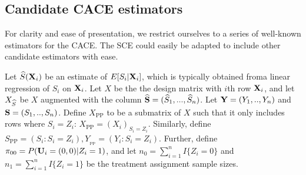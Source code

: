 \documentclass{article}
\def\spp{_{\text{PP}}}
\def\xpp{X\spp}
\newtheorem{assumption}{Assumption}
\begin{document}






\subsection{Candidate CACE estimators}
For clarity and ease of presentation, we restrict ourselves to a series of well-known estimators for the CACE. The SCE could easily be adapted to include other candidate estimators with ease. 

Let ${\widehat S}({\bf X}_i)$ be an estimate of $E[S_i | {\bf X}_i]$, which is typically obtained froma linear regression of $S_i$ on ${\bf X}_i$. Let $X$ be the the design matrix with $i$th row ${\bf X}_i$, and let $X_{\widehat S}$ be $X$ augmented with the column ${\widehat {{\bf S}}} = ({\widehat S}_1, ..., {\widehat S}_n)$. Let ${\bf Y} = (Y_1, .., Y_n)$ and ${\bf S} = (S_1, .., S_n)$. Define $\xpp$ to be a submatrix of $X$ such that it only includes rows where $S_i = Z_i$: $\xpp = (X_i)_{S_i = Z_i}$. Similarly, define $S\spp = (S_i : S_i = Z_i), Y_\spp = (Y_i : S_i = Z_i)$. Further, define $\pi_{00} = P({\bf U}_i = (0,0) | Z_i = 1)$, and let $n_0 = \sum_{i=1}^n I\{Z_i = 0\}$ and $n_1 = \sum_{i=1}^n I\{Z_i = 1\}$ be the treatment assignment sample sizes.
\end{document}
